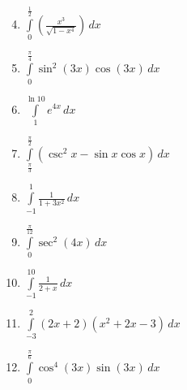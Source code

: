 \documentclass[12pt]{article}
\newif\ifans
\begin{document}
\begin{enumerate}
\setcounter{enumi}{3}

\item $\int\limits_{0}^{\frac{1}{2}}\left(\frac{x^3}{\sqrt{1-x^4}}\right)\,dx$ 

\ifans{\fbox{$\frac{4-\sqrt{15}}{8}$; Detailed Solution: \textcolor{blue}{\href{http://www.math.drexel.edu/classes/Calculus/resources/Math122HW/Solutions/122_06_Substitution_Definite_04.pdf}{Here}}}} \fi

\item $\int\limits_{0}^{\frac{\pi}{4}} \sin^{2}(3x)\cos{(3x)}\,dx$ 

\ifans{\fbox{$\frac{\sqrt{2}}{36}$}} \fi

\item $\int\limits_{1}^{\ln{10}}e^{4x}\,dx$ 

\ifans{\fbox{$2500-\frac{1}{4}e^{4}$}} \fi

\item $\int\limits_{\frac{\pi}{3}}^{\frac{\pi}{2}}(\csc^{2}{x}-\sin{x}\cos{x})\,dx$ 

\ifans{\fbox{$\frac{1}{\sqrt{3}}-\frac{1}{8}$; Detailed Solution: \textcolor{blue}{\href{http://www.math.drexel.edu/classes/Calculus/resources/Math122HW/Solutions/122_06_Substitution_Definite_07.pdf}{Here}}}} \fi

\item $\int\limits_{-1}^{1}\frac{1}{1+3x^2}\,dx$ 

\ifans{\fbox{$\frac{2\pi\sqrt{3}}{9}$; Detailed Solution: \textcolor{blue}{\href{http://www.math.drexel.edu/classes/Calculus/resources/Math122HW/Solutions/122_06_Substitution_Definite_08.pdf}{Here}}}} \fi

\item $\int\limits_{0}^{\frac{\pi}{12}} \sec^2{(4x)}\,dx$ 

\ifans{\fbox{$\frac{\sqrt{3}}{4}$}} \fi

\item $\int\limits_{-1}^{10}\frac{1}{2+x}\,dx$ 

\ifans{\fbox{$\ln{12}$}} \fi

\item $\int\limits_{-3}^{2} (2x+2)(x^2+2x-3)\,dx$ 

\ifans{\fbox{$\frac{25}{2}$}} \fi

\item $\int\limits_{0}^{\frac{\pi}{6}} \cos^4{(3x)}\sin{(3x)}\,dx$ 

\ifans{\fbox{$\frac{1}{15}$}} \fi


\end{enumerate}
\end{document}
